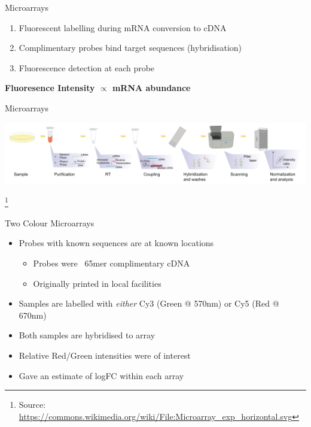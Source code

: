 \documentclass[aspectratio=169,11pt]{beamer}
\newcommand\blfootnote[1]{%
  \begingroup
  \renewcommand\thefootnote{}\footnote{#1}%
  \addtocounter{footnote}{-1}%
  \endgroup
}
\begin{document}
\begin{frame}{Microarrays}

	\begin{enumerate}

		\item Fluorescent labelling during mRNA conversion to cDNA
		\item Complimentary probes bind target sequences (hybridisation)
		\item Fluorescence detection at each probe
	
	\end{enumerate}

	\begin{center}
	\textbf{Fluoresence Intensity $\propto$ mRNA abundance	}
	\end{center}

\end{frame}

\begin{frame}{Microarrays}

	\begin{center}
	\includegraphics[scale=0.4]{figures/Microarrayhorizontal.png} 
	\end{center}
	
	\blfootnote{Source: \url{https://commons.wikimedia.org/wiki/File:Microarray\_exp\_horizontal.svg}}

\end{frame}

\begin{frame}{Two Colour Microarrays}

	\begin{itemize}
		\item Probes with known sequences are at known locations
		\begin{itemize}
			\item Probes were ~65mer complimentary cDNA
			\item Originally printed in local facilities
		\end{itemize}
		\item Samples are labelled with \textit{either} Cy3 (Green @ 570nm) or Cy5 (Red @ 670nm)
		\item Both samples are hybridised to array
		\item Relative Red/Green intensities were of interest
		\item Gave an estimate of logFC within each array
	\end{itemize}

\end{frame}
\end{document}
